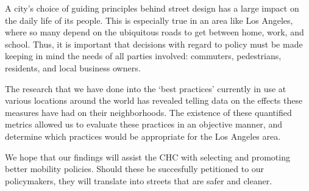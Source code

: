 A city's choice of guiding principles behind street design has a large impact on the daily life of its people. This is especially true in an area like Los Angeles, where so many depend on the ubiquitous roads to get between home, work, and school. Thus, it is important that decisions with regard to policy must be made keeping in mind the needs of all parties involved: commuters, pedestrians, residents, and local business owners.

The research that we have done into the `best practices' currently in use at various locations around the world has revealed telling data on the effects these measures have had on their neighborhoods. The existence of these quantified metrics allowed us to evaluate these practices in an objective manner, and determine which practices would be appropriate for the Los Angeles area.

We hope that our findings will assist the CHC with selecting and promoting better mobility policies. Should these be succesfully petitioned to our policymakers, they will translate into streets that are safer and cleaner.